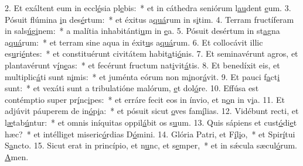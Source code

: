 2. Et exáltent eum in eccl\uline{é}sia pl\uline{e}bis:~* et in cáthedra seniórum l\uline{au}dent \uline{e}um.
3. Pósuit flúmina \uline{i}n des\uline{é}rtum:~* et éxitus a\uline{quá}rum in s\uline{i}tim.
4. Terram fructíferam in sals\uline{ú}g\uline{i}nem:~* a malítia inhabitánti\uline{u}m in \uline{e}a.
5. Pósuit desértum in st\uline{a}gna a\uline{quá}rum:~* et terram sine aqua in éxit\uline{u}s a\uline{quá}rum.
6. Et collocávit illic es\uline{u}ri\uline{é}ntes:~* et constituérunt civitátem habit\uline{a}ti\uline{ó}nis.
7. Et seminavérunt agros, et plantavérunt v\uline{í}n\uline{e}as:~* et fecérunt fructum nat\uline{i}vit\uline{á}tis.
8. Et benedíxit eis, et multiplic\uline{á}ti sunt n\uline{i}mis:~* et juménta eórum non m\uline{i}nor\uline{á}vit.
9. Et pauci f\uline{a}ct\uline{i} sunt:~* et vexáti sunt a tribulatióne malórum, \uline{e}t dol\uline{ó}re.
10. Effúsa est contémptio super pr\uline{í}nc\uline{i}pes:~* et erráre fecit eos in ínvio, et n\uline{o}n in v\uline{i}a.
11. Et adjúvit páuperem de in\uline{ó}p\uline{i}a:~* et pósuit sicut \uline{o}ves fam\uline{í}lias.
12. Vidébunt recti, et l\uline{æ}tab\uline{ú}ntur:~* et omnis iníquitas oppil\uline{á}bit os s\uline{u}um.
13. Quis sápiens et cust\uline{ó}di\uline{e}t hæc?~* et intélliget miseric\uline{ó}rdias D\uline{ó}mini.
14. Glória Patri, et F\uline{í}l\uline{i}o,~* et Spir\uline{í}tui S\uline{a}ncto.
15. Sicut erat in princípio, et n\uline{u}nc, et s\uline{e}mper,~* et in sǽcula sæcul\uline{ó}rum. \uline{A}men.
